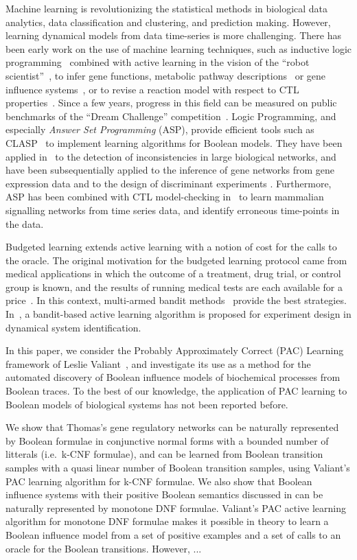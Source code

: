 \documentclass{llncs}
\begin{document}
Machine learning is revolutionizing the statistical methods in biological data analytics,
data classification and clustering, and prediction making.
However, learning dynamical models from data time-series is more challenging.
There has been early work on the use of machine learning techniques, such as inductive
 logic programming~\cite{Muggleton95ngc} combined with active learning in the vision of the ``robot scientist''~\cite{BMOKRK01etai},
to infer gene functions,
metabolic pathway descriptions~\cite{AM02etai,AM02slps}
or gene influence systems~\cite{BCRG04jtb},
or to revise a reaction model with respect to CTL properties~\cite{CCFS06tcsb}.
Since a few years, progress in this field can be measured on public benchmarks
of the ``Dream Challenge'' competition~\cite{Meyer14bmc}.
Logic Programming, and especially \emph{Answer Set Programming} (ASP), provide efficient tools such as CLASP~\cite{GKNS07lpnmr}
to implement learning algorithms for Boolean models.
They have been applied in~\cite{GSTUV08iclp} to the detection of  inconsistencies in large biological networks,
and have been subsequentially applied to the inference of gene networks from gene expression data and to the design of discriminant experiments \cite{VKASSSG15frontiers}.
Furthermore, ASP has been combined with CTL model-checking in~\cite{OPSSG16biosystems} to learn mammalian signalling networks from time series data,
and identify erroneous time-points in the data.

Budgeted learning extends active learning with a notion of cost for the calls to the oracle.
The original motivation for the budgeted learning protocol came from medical applications in which the outcome of a treatment,
drug trial, or control group is known, and the results of running medical tests are each available for a price~\cite{DZBSM13ml}.
In this context, multi-armed bandit methods~\cite{DBSSZ07icdm} provide the best strategies.
In~\cite{LMALS14ecml}, a bandit-based active learning algorithm is proposed for experiment design in dynamical system identification.

In this paper, we consider the Probably Approximately Correct (PAC) Learning 
framework of Leslie Valiant~\cite{Valiant84cacm},
and investigate its use as a method for the automated discovery of Boolean influence models of biochemical processes from Boolean traces. 
To the best of our knowledge, 
the application of PAC learning to Boolean models of biological systems has not been reported before.

We show that Thomas's gene regulatory networks \cite{Thomas91jtb,Thomas73jtb} can be naturally represented by 
Boolean formulae in conjunctive normal forms with a bounded number of litterals (i.e.~k-CNF formulae),
and can be learned from Boolean transition samples with a quasi linear number of Boolean transition samples, using Valiant's PAC learning algorithm for k-CNF formulae.
We also show that Boolean influence systems with their positive Boolean semantics discussed in \cite{FMRS16cmsb}
can be naturally represented by monotone DNF formulae.
Valiant's PAC active learning algorithm for monotone DNF formulae makes it possible in theory 
to learn a Boolean influence model from a set of positive examples and a set of calls to an oracle for the Boolean transitions.
However, ...
\end{document}
